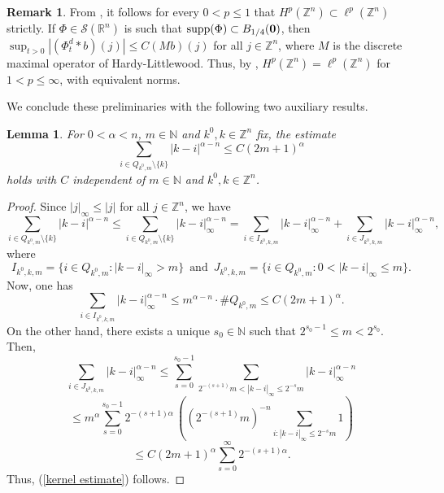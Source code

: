 \documentclass[leqno,12pt]{article} %
\newcommand\supp{\mathop{\rm supp}}
\theoremstyle{plain} %
\newtheorem{lemma}[theorem]{\indent\sc Lemma}
\theoremstyle{definition} %
\newtheorem{remark}[theorem]{\indent\sc Remark}
\begin{document}
\begin{remark} \label{Hp equiv}
From \cite[Corollary 4]{Rocha}, it follows for every $0 < p \leq 1$ that $H^p(\mathbb{Z}^n) \subset \ell^p(\mathbb{Z}^n)$ strictly. If 
$\Phi \in \mathcal{S}(\mathbb{R}^n)$ is such that $\supp(\Phi) \subset B_{1/4}({\bf 0 })$, then 
$\sup_{t>0} |(\Phi_t^d \ast b)(j)| \leq C (Mb)(j)$ for all $j \in \mathbb{Z}^n$, where $M$ is the discrete maximal operator of 
Hardy-Littlewood. Thus, by \cite[Theorem 2.3]{PRocha}, $H^p(\mathbb{Z}^n) = \ell^p(\mathbb{Z}^n)$ for $1 < p \leq \infty$, with equivalent norms. 
\end{remark}

We conclude these preliminaries with the following two auxiliary results.

\begin{lemma} For $0 < \alpha < n$, $m \in \mathbb{N}$ and $k^0, k \in \mathbb{Z}^n$ fix, the estimate
\begin{equation} \label{kernel estimate}
\sum_{i \in Q_{k^0, m} \setminus \{ k \}} |k-i|^{\alpha - n} \leq C (2m+1)^{\alpha}
\end{equation}
holds with $C$ independent of $m \in \mathbb{N}$ and $k^0, k \in \mathbb{Z}^n$.
\end{lemma}

\begin{proof}
Since $|j|_{\infty} \leq |j|$ for all $j \in \mathbb{Z}^n$, we have
\[
\sum_{i \in Q_{k^0, m} \setminus \{ k \}} |k-i|^{\alpha - n} \leq \sum_{i \in Q_{k^0, m} \setminus \{ k \}} |k-i|^{\alpha - n}_{\infty}
= \sum_{i \in I_{k^0, k, m}} |k-i|^{\alpha - n}_{\infty} + \sum_{i \in J_{k^0, k, m}} |k-i|^{\alpha - n}_{\infty},
\]
where
\[
I_{k^0, k, m} = \{ i \in Q_{k^0, m} : |k-i|_{\infty} > m \} \,\,\, \text{and} \,\,\, J_{k^0, k, m} = \{ i \in Q_{k^0, m} : 0<|k-i|_{\infty} 
\leq m \}.
\]
Now, one has
\[
\sum_{i \in I_{k^0, k, m}} |k-i|^{\alpha - n}_{\infty} \leq m^{\alpha - n} \cdot \#Q_{k^0, m} \leq C (2m+1)^{\alpha}.
\]
On the other hand, there exists a unique $s_0 \in \mathbb{N}$ such that $2^{s_0 - 1} \leq m < 2^{s_0}$. Then,
\[
\sum_{i \in J_{k^0, k, m}} |k-i|^{\alpha - n}_{\infty} \leq \sum_{s=0}^{s_0 - 1} \sum_{2^{-(s+1)} m < |k-i|_{\infty} \leq 2^{-s} m} 
|k-i|^{\alpha - n}_{\infty}
\]
\[
\leq m^{\alpha} \sum_{s=0}^{s_0 - 1} 2^{-(s+1) \alpha} \, \left( (2^{-(s+1)} m)^{-n} \sum_{i: |k-i|_{\infty} \leq 2^{-s} m} 1 \right)
\]
\[
\leq C (2m+1)^{\alpha} \sum_{s=0}^{\infty} 2^{-(s+1) \alpha}.
\]
Thus, (\ref{kernel estimate}) follows.
\end{proof}
\end{document}
